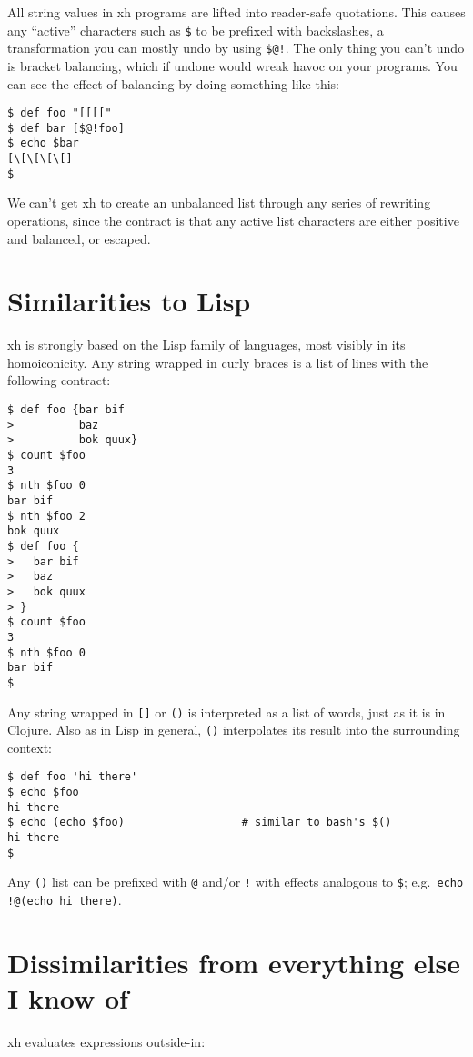 \documentclass{report}
\begin{document}
  All string values in xh programs are lifted into reader-safe quotations. This
  causes any ``active'' characters such as \verb|$| to be prefixed with
  backslashes, a transformation you can mostly undo by using \verb|$@!|. The
  only thing you can't undo is bracket balancing, which if undone would wreak
  havoc on your programs. You can see the effect of balancing by doing
  something like this:

\begin{verbatim}
$ def foo "[[[["
$ def bar [$@!foo]
$ echo $bar
[\[\[\[\[]
$
\end{verbatim}

  We can't get xh to create an unbalanced list through any series of rewriting
  operations, since the contract is that any active list characters are either
  positive and balanced, or escaped.

\chapter{Similarities to Lisp}\label{chp:similarities-to-lisp}
  xh is strongly based on the Lisp family of languages, most visibly in its
  homoiconicity. Any string wrapped in curly braces is a list of lines with the
  following contract:

\begin{verbatim}
$ def foo {bar bif
>          baz
>          bok quux}
$ count $foo
3
$ nth $foo 0
bar bif
$ nth $foo 2
bok quux
$ def foo {
>   bar bif
>   baz
>   bok quux
> }
$ count $foo
3
$ nth $foo 0
bar bif
$
\end{verbatim}

  Any string wrapped in \verb|[]| or \verb|()| is interpreted as a list of
  words, just as it is in Clojure. Also as in Lisp in general, \verb|()|
  interpolates its result into the surrounding context:

\begin{verbatim}
$ def foo 'hi there'
$ echo $foo
hi there
$ echo (echo $foo)                  # similar to bash's $()
hi there
$
\end{verbatim}

  Any \verb|()| list can be prefixed with \verb|@| and/or \verb|!| with effects
  analogous to \verb|$|; e.g.~\verb|echo !@(echo hi there)|.

\chapter{Dissimilarities from everything else I know of}\label{chp:dissimilarities}
  xh evaluates expressions outside-in:
\end{document}

